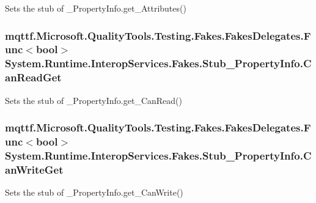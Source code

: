 Sets the stub of \-\_\-\-Property\-Info.\-get\-\_\-\-Attributes()

\hypertarget{class_system_1_1_runtime_1_1_interop_services_1_1_fakes_1_1_stub___property_info_a9d0e4972c616781b0dfe508597f4ef35}{
\subsubsection[{Can\-Read\-Get}]{\setlength{\rightskip}{0pt plus 5cm}mqttf.\-Microsoft.\-Quality\-Tools.\-Testing.\-Fakes.\-Fakes\-Delegates.\-Func$<$bool$>$ System.\-Runtime.\-Interop\-Services.\-Fakes.\-Stub\-\_\-\-Property\-Info.\-Can\-Read\-Get}}\label{class_system_1_1_runtime_1_1_interop_services_1_1_fakes_1_1_stub___property_info_a9d0e4972c616781b0dfe508597f4ef35}


Sets the stub of \-\_\-\-Property\-Info.\-get\-\_\-\-Can\-Read()

\hypertarget{class_system_1_1_runtime_1_1_interop_services_1_1_fakes_1_1_stub___property_info_ab5e1306f9a62d6c33f25865216537da8}{
\subsubsection[{Can\-Write\-Get}]{\setlength{\rightskip}{0pt plus 5cm}mqttf.\-Microsoft.\-Quality\-Tools.\-Testing.\-Fakes.\-Fakes\-Delegates.\-Func$<$bool$>$ System.\-Runtime.\-Interop\-Services.\-Fakes.\-Stub\-\_\-\-Property\-Info.\-Can\-Write\-Get}}\label{class_system_1_1_runtime_1_1_interop_services_1_1_fakes_1_1_stub___property_info_ab5e1306f9a62d6c33f25865216537da8}


Sets the stub of \-\_\-\-Property\-Info.\-get\-\_\-\-Can\-Write()

